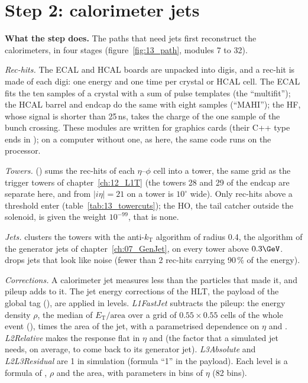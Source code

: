 \FloatBarrier
\section{Step 2: calorimeter jets}

\textbf{What the step does.} The paths that need jets first reconstruct the calorimeters, in four stages
(figure~\ref{fig:13_path}, modules 7 to 32).

\emph{Rec-hits.} The ECAL and HCAL boards are unpacked into digis, and a rec-hit is made of each digi: one energy and
one time per crystal or HCAL cell. The ECAL fits the ten samples of a crystal with a sum of pulse templates (the
``multifit''); the HCAL barrel and endcap do the same with eight samples (``MAHI''); the HF, whose signal is shorter
than 25\,ns, takes the charge of the one sample of the bunch crossing. These modules are written for graphics cards (their C++ type ends in
); on a computer without one, as here, the same code runs on the processor.

\emph{Towers.}  () sums the rec-hits of each $\eta$--$\phi$ cell
into a tower, the same grid as the trigger towers of chapter~\ref{ch:12_L1T} (the towers 28 and 29 of the endcap are
separate here, and from $|i\eta|=21$ on a tower is $10^\circ$ wide). Only rec-hits above a threshold enter
(table~\ref{tab:13_towercuts}); the HO, the tail catcher outside the solenoid, is given the weight $10^{-99}$, that is
none.

\emph{Jets.}  clusters the towers with the anti-$k_{\mathrm T}$ algorithm of radius 0.4, the
algorithm of the generator jets of chapter~\ref{ch:07_GenJet}, on every tower above $0.3\GeV$.
 drops jets that look like noise (fewer than 2 rec-hits carrying 90\,\% of the energy).

\emph{Corrections.} A calorimeter jet measures less than the particles that made it, and pileup adds to it. The
jet energy corrections of the HLT, the payload  of the global tag
(), are applied in levels. \emph{L1FastJet}
subtracts the pileup: the energy density $\rho$, the median of $E_{\mathrm T}/\text{area}$ over a grid of
$0.55\times0.55$ cells of the whole event (), times the area of the jet, with a
parametrised dependence on $\eta$ and \pt. \emph{L2Relative} makes the response flat in $\eta$ and \pt{} (the factor
that a simulated jet needs, on average, to come back to its generator jet). \emph{L3Absolute} and
\emph{L2L3Residual} are 1 in simulation (formula ``1'' in the payload). Each level is a formula of \pt, $\rho$ and the
area, with parameters in bins of $\eta$ (82 bins).

